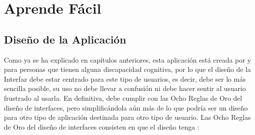 \chapter{Aprende Fácil}
\label{cap:aprendeFacil}




\section{Diseño de la Aplicación}
\label{cap:sec:disenioInterfaz}
Como ya se ha explicado en capítulos anteriores, esta aplicación está creada por y para personas que tienen alguna discapacidad cognitiva, por lo que el diseño de la Interfaz debe estar centrado para este tipo de usuarios, es decir, debe ser lo más sencilla posible, su uso no debe llevar a confusión ni debe hacer sentir al usuario frustrado al usarla. En definitiva, debe cumplir con las Ocho Reglas de Oro del diseño de interfaces, pero simplificándola aún más de lo que podría ser un diseño para otro tipo de aplicación destinada para otro tipo de usuario. 
Las Ocho Reglas de Oro del diseño de interfaces consisten en que el diseño tenga \citep{ochoreglasdeoro}:
